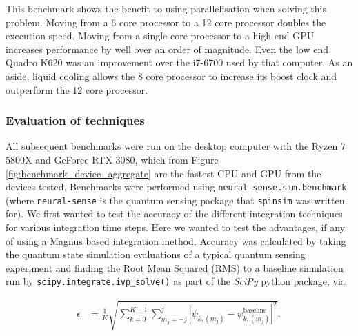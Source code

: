 \documentclass{jors}
\begin{document}

			This benchmark shows the benefit to using parallelisation when solving this problem. Moving from a 6 core processor to a 12 core processor doubles the execution speed. Moving from a single core processor to a high end GPU increases performance by well over an order of magnitude. Even the low end Quadro K620 was an improvement over the i7-6700 used by that computer. As an aside, liquid cooling allows the 8 core processor to increase its boost clock and outperform the 12 core processor.

		\subsubsection*{Evaluation of techniques}
		All subsequent benchmarks were run on the desktop computer with the Ryzen 7 5800X and GeForce RTX 3080, which from Figure \ref{fig:benchmark_device_aggregate} are the fastest CPU and GPU from the devices tested. Benchmarks were performed using \texttt{neural-sense.sim.benchmark} (where \texttt{neural-sense} \cite{alexander-tritt-monash_alexander-tritt-monashneural-sense_2020} is the quantum sensing package that \texttt{spinsim} was written for). We first wanted to test the accuracy of the different integration techniques for various integration time steps. Here we wanted to test the advantages, if any of using a Magnus based integration method. Accuracy was calculated by taking the quantum state simulation evaluations of a typical quantum sensing experiment and finding the Root Mean Squared (RMS) to a baseline simulation run by \texttt{scipy.integrate.ivp\_solve()} as part of the \emph{SciPy} python package, via

			\begin{align}
                \epsilon &= \frac{1}{K}\sqrt{\sum_{k = 0}^{K - 1}\sum_{m_j = -j}^j|\psi_{k, (m_j)} - \psi_{k, (m_j)}^{\textrm{baseline}}|^2},\label{eq:error}
            \end{align}
\end{document}
